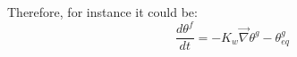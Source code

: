 Therefore, for instance it could be:
\begin{equation}
\frac{d \theta^f}{dt} = -K_w \vec{\nabla}{\theta^g - \theta^g_{eq}}
\end{equation}